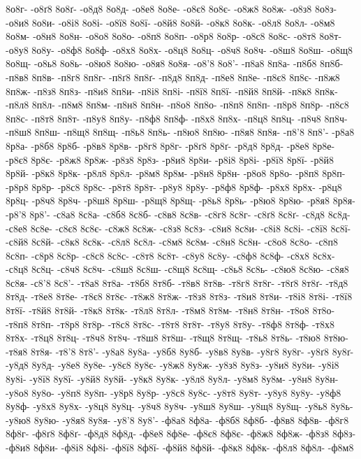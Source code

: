 {8о8г-
-о8ґ8
8о8ґ-
-о8д8
8о8д-
-о8е8
8о8е-
-о8є8
8о8є-
-о8ж8
8о8ж-
-о8з8
8о8з-
-о8и8
8о8и-
-о8і8
8о8і-
-о8ї8
8о8ї-
-о8й8
8о8й-
-о8к8
8о8к-
-о8л8
8о8л-
-о8м8
8о8м-
-о8н8
8о8н-
-о8о8
8о8о-
-о8п8
8о8п-
-о8р8
8о8р-
-о8с8
8о8с-
-о8т8
8о8т-
-о8у8
8о8у-
-о8ф8
8о8ф-
-о8х8
8о8х-
-о8ц8
8о8ц-
-о8ч8
8о8ч-
-о8ш8
8о8ш-
-о8щ8
8о8щ-
-о8ь8
8о8ь-
-о8ю8
8о8ю-
-о8я8
8о8я-
-о8'8
8о8'-
-п8а8
8п8а-
-п8б8
8п8б-
-п8в8
8п8в-
-п8г8
8п8г-
-п8ґ8
8п8ґ-
-п8д8
8п8д-
-п8е8
8п8е-
-п8є8
8п8є-
-п8ж8
8п8ж-
-п8з8
8п8з-
-п8и8
8п8и-
-п8і8
8п8і-
-п8ї8
8п8ї-
-п8й8
8п8й-
-п8к8
8п8к-
-п8л8
8п8л-
-п8м8
8п8м-
-п8н8
8п8н-
-п8о8
8п8о-
-п8п8
8п8п-
-п8р8
8п8р-
-п8с8
8п8с-
-п8т8
8п8т-
-п8у8
8п8у-
-п8ф8
8п8ф-
-п8х8
8п8х-
-п8ц8
8п8ц-
-п8ч8
8п8ч-
-п8ш8
8п8ш-
-п8щ8
8п8щ-
-п8ь8
8п8ь-
-п8ю8
8п8ю-
-п8я8
8п8я-
-п8'8
8п8'-
-р8а8
8р8а-
-р8б8
8р8б-
-р8в8
8р8в-
-р8г8
8р8г-
-р8ґ8
8р8ґ-
-р8д8
8р8д-
-р8е8
8р8е-
-р8є8
8р8є-
-р8ж8
8р8ж-
-р8з8
8р8з-
-р8и8
8р8и-
-р8і8
8р8і-
-р8ї8
8р8ї-
-р8й8
8р8й-
-р8к8
8р8к-
-р8л8
8р8л-
-р8м8
8р8м-
-р8н8
8р8н-
-р8о8
8р8о-
-р8п8
8р8п-
-р8р8
8р8р-
-р8с8
8р8с-
-р8т8
8р8т-
-р8у8
8р8у-
-р8ф8
8р8ф-
-р8х8
8р8х-
-р8ц8
8р8ц-
-р8ч8
8р8ч-
-р8ш8
8р8ш-
-р8щ8
8р8щ-
-р8ь8
8р8ь-
-р8ю8
8р8ю-
-р8я8
8р8я-
-р8'8
8р8'-
-с8а8
8с8а-
-с8б8
8с8б-
-с8в8
8с8в-
-с8г8
8с8г-
-с8ґ8
8с8ґ-
-с8д8
8с8д-
-с8е8
8с8е-
-с8є8
8с8є-
-с8ж8
8с8ж-
-с8з8
8с8з-
-с8и8
8с8и-
-с8і8
8с8і-
-с8ї8
8с8ї-
-с8й8
8с8й-
-с8к8
8с8к-
-с8л8
8с8л-
-с8м8
8с8м-
-с8н8
8с8н-
-с8о8
8с8о-
-с8п8
8с8п-
-с8р8
8с8р-
-с8с8
8с8с-
-с8т8
8с8т-
-с8у8
8с8у-
-с8ф8
8с8ф-
-с8х8
8с8х-
-с8ц8
8с8ц-
-с8ч8
8с8ч-
-с8ш8
8с8ш-
-с8щ8
8с8щ-
-с8ь8
8с8ь-
-с8ю8
8с8ю-
-с8я8
8с8я-
-с8'8
8с8'-
-т8а8
8т8а-
-т8б8
8т8б-
-т8в8
8т8в-
-т8г8
8т8г-
-т8ґ8
8т8ґ-
-т8д8
8т8д-
-т8е8
8т8е-
-т8є8
8т8є-
-т8ж8
8т8ж-
-т8з8
8т8з-
-т8и8
8т8и-
-т8і8
8т8і-
-т8ї8
8т8ї-
-т8й8
8т8й-
-т8к8
8т8к-
-т8л8
8т8л-
-т8м8
8т8м-
-т8н8
8т8н-
-т8о8
8т8о-
-т8п8
8т8п-
-т8р8
8т8р-
-т8с8
8т8с-
-т8т8
8т8т-
-т8у8
8т8у-
-т8ф8
8т8ф-
-т8х8
8т8х-
-т8ц8
8т8ц-
-т8ч8
8т8ч-
-т8ш8
8т8ш-
-т8щ8
8т8щ-
-т8ь8
8т8ь-
-т8ю8
8т8ю-
-т8я8
8т8я-
-т8'8
8т8'-
-у8а8
8у8а-
-у8б8
8у8б-
-у8в8
8у8в-
-у8г8
8у8г-
-у8ґ8
8у8ґ-
-у8д8
8у8д-
-у8е8
8у8е-
-у8є8
8у8є-
-у8ж8
8у8ж-
-у8з8
8у8з-
-у8и8
8у8и-
-у8і8
8у8і-
-у8ї8
8у8ї-
-у8й8
8у8й-
-у8к8
8у8к-
-у8л8
8у8л-
-у8м8
8у8м-
-у8н8
8у8н-
-у8о8
8у8о-
-у8п8
8у8п-
-у8р8
8у8р-
-у8с8
8у8с-
-у8т8
8у8т-
-у8у8
8у8у-
-у8ф8
8у8ф-
-у8х8
8у8х-
-у8ц8
8у8ц-
-у8ч8
8у8ч-
-у8ш8
8у8ш-
-у8щ8
8у8щ-
-у8ь8
8у8ь-
-у8ю8
8у8ю-
-у8я8
8у8я-
-у8'8
8у8'-
-ф8а8
8ф8а-
-ф8б8
8ф8б-
-ф8в8
8ф8в-
-ф8г8
8ф8г-
-ф8ґ8
8ф8ґ-
-ф8д8
8ф8д-
-ф8е8
8ф8е-
-ф8є8
8ф8є-
-ф8ж8
8ф8ж-
-ф8з8
8ф8з-
-ф8и8
8ф8и-
-ф8і8
8ф8і-
-ф8ї8
8ф8ї-
-ф8й8
8ф8й-
-ф8к8
8ф8к-
-ф8л8
8ф8л-
-ф8м8
}

